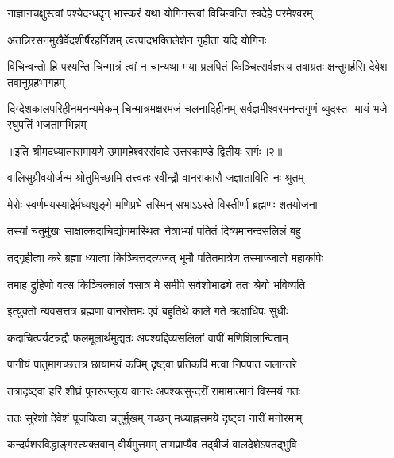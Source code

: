 \twolineshloka
{नाज्ञानचक्षुस्त्वां पश्येदन्धदृग् भास्करं यथा}
{योगिनस्त्वां विचिन्वन्ति स्वदेहे परमेश्वरम्} %

\twolineshloka
{अतन्निरसनमुखैर्वेदशीर्षैरहर्निशम्}
{त्वत्पादभक्तिलेशेन गृहीता यदि योगिनः} %

\threelineshloka
{विचिन्वन्तो हि पश्यन्ति चिन्मात्रं त्वां न चान्यथा}
{मया प्रलपितं किञ्चित्सर्वज्ञस्य तवाग्रतः}
{क्षन्तुमर्हसि देवेश तवानुग्रहभागहम्} %

\fourlineindentedshloka
{दिग्देशकालपरिहीनमनन्यमेकम्}
{चिन्मात्रमक्षरमजं चलनादिहीनम्}
{सर्वज्ञमीश्वरमनन्तगुणं व्युदस्त-}
{मायं भजे रघुपतिं भजतामभिन्नम्} %

{॥इति श्रीमदध्यात्मरामायणे उमामहेश्वरसंवादे उत्तरकाण्डे द्वितीयः
सर्गः॥२॥
}





\twolineshloka
{वालिसुग्रीवयोर्जन्म श्रोतुमिच्छामि तत्त्वतः}
{रवीन्द्रौ वानराकारौ जज्ञाताविति नः श्रुतम्} %


\twolineshloka
{मेरोः स्वर्णमयस्याद्रेर्मध्यशृङ्गे मणिप्रभे}
{तस्मिन् सभाऽऽस्ते विस्तीर्णा ब्रह्मणः शतयोजना} %

\twolineshloka
{तस्यां चतुर्मुखः साक्षात्कदाचिद्योगमास्थितः}
{नेत्राभ्यां पतितं दिव्यमानन्दसलिलं बहु} %

\twolineshloka
{तद्गृहीत्वा करे ब्रह्मा ध्यात्वा किञ्चित्तदत्यजत्}
{भूमौ पतितमात्रेण तस्माज्जातो महाकपिः} %

\twolineshloka
{तमाह द्रुहिणो वत्स किञ्चित्कालं वसात्र मे}
{समीपे सर्वशोभाढ्ये ततः श्रेयो भविष्यति} %

\twolineshloka
{इत्युक्तो न्यवसत्तत्र ब्रह्मणा वानरोत्तमः}
{एवं बहुतिथे काले गते ऋक्षाधिपः सुधीः} %

\twolineshloka
{कदाचित्पर्यटन्नद्रौ फलमूलार्थमुद्यतः}
{अपश्यद्दिव्यसलिलां वापीं मणिशिलान्विताम्} %

\twolineshloka
{पानीयं पातुमागच्छत्तत्र छायामयं कपिम्}
{दृष्ट्वा प्रतिकपिं मत्वा निपपात जलान्तरे} %

\twolineshloka
{तत्रादृष्ट्वा हरिं शीघ्रं पुनरुत्प्लुत्य वानरः}
{अपश्यत्सुन्दरीं रामामात्मानं विस्मयं गतः} %

\twolineshloka
{ततः सुरेशो देवेशं पूजयित्वा चतुर्मुखम्}
{गच्छन् मध्याह्नसमये दृष्ट्वा नारीं मनोरमाम्} %

\twolineshloka
{कन्दर्पशरविद्धाङ्गस्त्यक्तवान् वीर्यमुत्तमम्}
{तामप्राप्यैव तद्बीजं वालदेशेऽपतद्भुवि} %

